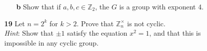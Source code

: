 \documentclass[paper=usletter, fontsize=12pt]{article}
\begin{document}
\begin{itemize}
\begin{itemize}
\begin{itemize}
                \item[\textbf{b}] Show that if $a,b,c\in \mathbb{Z}_2$, the $G$
                is a group with exponent 4.
                \begin{cproof}
                \end{cproof}

            \end{itemize}

            \item[\textbf{19}] Let $n=2^k$ for $k>2$. Prove that
            $\mathbb{Z}_{n}^{\times}$ is not cyclic. \\ \textit{Hint}: Show
            that $\pm 1$ satisfy the equation $x^2=1$, and that this is
            impossible in any cyclic group.
            \begin{cproof}
            \end{cproof}

        \end{itemize}

    \end{itemize}
\end{document}
